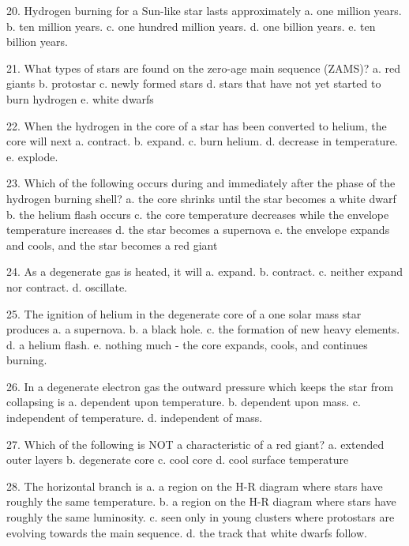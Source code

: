   20. Hydrogen burning for a Sun-like star lasts approximately
      a.  one million years.
      b.  ten million years.
      c.  one hundred million years.
      d.  one billion years.
      e.  ten billion years.
      
  21. What types of stars are found on the zero-age main sequence
      (ZAMS)?
      a.  red giants
      b.  protostar
      c.  newly formed stars
      d.  stars that have not yet started to burn hydrogen
      e.  white dwarfs
      
  22. When the hydrogen in the core of a star has been converted to
      helium, the core will next
      a.  contract.
      b.  expand.
      c.  burn helium.
      d.  decrease in temperature.
      e.  explode.
      
  23. Which of the following occurs during and immediately after the
      phase of the hydrogen burning shell?
      a.  the core shrinks until the star becomes a white dwarf
      b.  the helium flash occurs
      c.  the core temperature decreases while the envelope temperature increases
      d.  the star becomes a supernova
      e.  the envelope expands and cools, and the star becomes a red
          giant
      
  24. As a degenerate gas is heated, it will
      a.  expand.
      b.  contract.
      c.  neither expand nor contract.
      d.  oscillate.
      
  25. The ignition of helium in the degenerate core of a one solar
      mass star produces
      a.  a supernova.
      b.  a black hole.
      c.  the formation of new heavy elements.
      d.  a helium flash.
      e.  nothing much - the core expands, cools, and continues
          burning.
       
  26. In a degenerate electron gas the outward pressure which keeps
      the star from collapsing is
      a.  dependent upon temperature.
      b.  dependent upon mass.
      c.  independent of temperature.
      d.  independent of mass.
      
  27. Which of the following is NOT a characteristic of a red giant?
      a.  extended outer layers
      b.  degenerate core
      c.  cool core
      d.  cool surface temperature
      
 
  28. The horizontal branch is
      a.  a region on the H-R diagram where stars have roughly the same temperature.
      b.  a region on the H-R diagram where stars have roughly the same luminosity.
      c.  seen only in young clusters where protostars are evolving towards the main sequence.
      d.  the track that white dwarfs follow.
      
